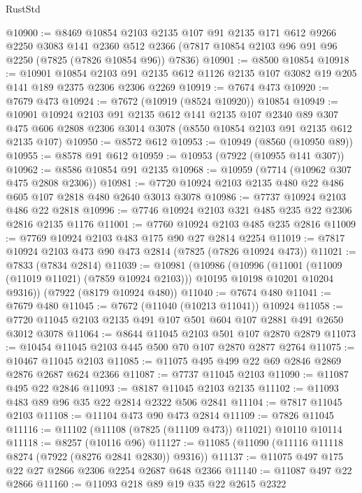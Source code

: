 \begin{lexlean}{RustStd}
\begin{coremodule}
@10900 := @8469
    @10854
    @2103
    @2135
    @107
    @91
    @2135
    @171
    @612
    @9266
    @2250
    @3083
    @141
    @2360
    @512
    @2366
    (@7817 @10854 @2103 @96 @91 @96 @2250 (@7825 (@7826 @10854 @96)) @7836)
@10901 := @8500 @10854
@10918 := @10901
    @10854
    @2103
    @91
    @2135
    @612
    @1126
    @2135
    @107
    @3082
    @19
    @205
    @141
    @189
    @2375
    @2306
    @2306
    @2269
@10919 := @7674 @473
@10920 := @7679 @473
@10924 := @7672 (@10919 (@8524 @10920)) @10854
@10949 := @10901
    @10924
    @2103
    @91
    @2135
    @612
    @141
    @2135
    @107
    @2340
    @89
    @307
    @475
    @606
    @2808
    @2306
    @3014
    @3078
    (@8550 @10854 @2103 @91 @2135 @612 @2135 @107)
@10950 := @8572 @612
@10953 := @10949 (@8560 (@10950 @89))
@10955 := @8578 @91 @612
@10959 := @10953 (@7922 (@10955 @141 @307))
@10962 := @8586 @10854 @91 @2135
@10968 := @10959 (@7714 (@10962 @307 @475 @2808 @2306))
@10981 := @7720 @10924 @2103 @2135 @480 @22 @486 @605 @107 @2818 @480 @2640 @3013 @3078
@10986 := @7737 @10924 @2103 @486 @22 @2818
@10996 := @7746 @10924 @2103 @321 @485 @235 @22 @2306 @2816 @2135 @1176
@11001 := @7760 @10924 @2103 @485 @235 @2816
@11009 := @7769 @10924 @2103 @483 @175 @90 @27 @2814 @2254
@11019 := @7817 @10924 @2103 @473 @90 @473 @2814 (@7825 (@7826 @10924 @473))
@11021 := @7833 (@7834 @2814)
@11039 := @10981
    (@10986
      (@10996
        (@11001 (@11009 (@11019 @11021) (@7859 @10924 @2103)))
        @10195
        @10198
        @10201
        @10204
        @9316))
    (@7922 (@8179 @10924 @480))
@11040 := @7674 @480
@11041 := @7679 @480
@11045 := @7672 (@11040 (@10213 @11041)) @10924
@11058 := @7720 @11045 @2103 @2135 @491 @107 @501 @604 @107 @2881 @491 @2650 @3012 @3078
@11064 := @8644 @11045 @2103 @501 @107 @2870 @2879
@11073 := @10454 @11045 @2103 @445 @500 @70 @107 @2870 @2877 @2764
@11075 := @10467 @11045 @2103
@11085 := @11075 @495 @499 @22 @69 @2846 @2869 @2876 @2687 @624 @2366
@11087 := @7737 @11045 @2103
@11090 := @11087 @495 @22 @2846
@11093 := @8187 @11045 @2103 @2135
@11102 := @11093 @483 @89 @96 @35 @22 @2814 @2322 @506 @2841
@11104 := @7817 @11045 @2103
@11108 := @11104 @473 @90 @473 @2814
@11109 := @7826 @11045
@11116 := @11102 (@11108 (@7825 (@11109 @473)) @11021) @10110 @10114
@11118 := @8257 (@10116 @96)
@11127 := @11085 (@11090 (@11116 @11118 @8274 (@7922 (@8276 @2841 @2830)) @9316))
@11137 := @11075 @497 @175 @22 @27 @2866 @2306 @2254 @2687 @648 @2366
@11140 := @11087 @497 @22 @2866
@11160 := @11093
    @218
    @89
    @19
    @35
    @22
    @2615
    @2322

\end{coremodule}
\end{lexlean}

